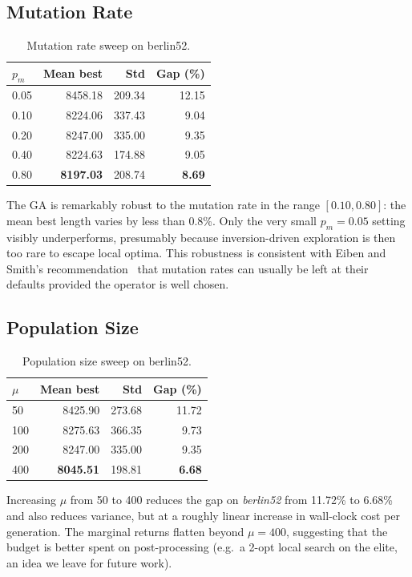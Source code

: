 \documentclass[conference]{IEEEtran}
\begin{document}
\subsection{Mutation Rate}

\begin{table}[h]
\caption{Mutation rate sweep on berlin52.}
\label{tab:mut-rate}
\centering
\begin{tabular}{lrrr}
\toprule
$p_m$ & Mean best & Std & Gap (\%) \\
\midrule
0.05 & 8458.18 & 209.34 & 12.15 \\
0.10 & 8224.06 & 337.43 & 9.04 \\
0.20 & 8247.00 & 335.00 & 9.35 \\
0.40 & 8224.63 & 174.88 & 9.05 \\
0.80 & \textbf{8197.03} & 208.74 & \textbf{8.69} \\
\bottomrule
\end{tabular}
\end{table}

The GA is remarkably robust to the mutation rate in the range
$[0.10, 0.80]$: the mean best length varies by less than 0.8\%. Only the
very small $p_m = 0.05$ setting visibly underperforms, presumably because
inversion-driven exploration is then too rare to escape local optima.
This robustness is consistent with Eiben and Smith's
recommendation~\cite{eiben2015} that mutation rates can usually be left at
their defaults provided the operator is well chosen.

\subsection{Population Size}

\begin{table}[h]
\caption{Population size sweep on berlin52.}
\label{tab:pop-size}
\centering
\begin{tabular}{lrrr}
\toprule
$\mu$ & Mean best & Std & Gap (\%) \\
\midrule
50  & 8425.90 & 273.68 & 11.72 \\
100 & 8275.63 & 366.35 & 9.73 \\
200 & 8247.00 & 335.00 & 9.35 \\
400 & \textbf{8045.51} & 198.81 & \textbf{6.68} \\
\bottomrule
\end{tabular}
\end{table}

Increasing $\mu$ from 50 to 400 reduces the gap on \textit{berlin52} from
11.72\% to 6.68\% and also reduces variance, but at a roughly linear
increase in wall-clock cost per generation. The marginal returns flatten
beyond $\mu=400$, suggesting that the budget is better spent on
post-processing (e.g.\ a 2-opt local search on the elite, an idea we leave
for future work).
\end{document}
